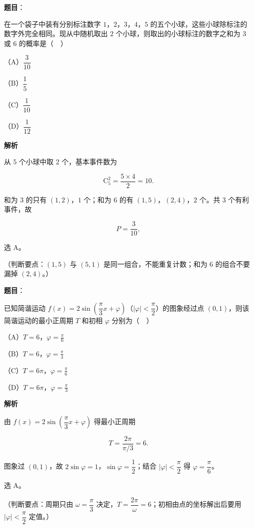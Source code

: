 \begin{answer}

\textbf{题目}：

在一个袋子中装有分别标注数字 $1$，$2$，$3$，$4$，$5$ 的五个小球，这些小球除标注的数字外完全相同。现从中随机取出 $2$ 个小球，则取出的小球标注的数字之和为 $3$ 或 $6$ 的概率是（　）

（A）$\dfrac{3}{10}$

（B）$\dfrac15$

（C）$\dfrac1{10}$

（D）$\dfrac1{12}$

\textbf{解析}

从 $5$ 个小球中取 $2$ 个，基本事件数为

\nopagebreak[4]
\[\mathrm C_5^2=\frac{5\times4}{2}=10.\]

和为 $3$ 的只有 $(1,2)$，$1$ 个；和为 $6$ 的有 $(1,5)$，$(2,4)$，$2$ 个。共 $3$ 个有利事件，故

\nopagebreak[4]
\[P=\frac{3}{10},\]

选 A。

（判断要点：$(1,5)$ 与 $(5,1)$ 是同一组合，不能重复计数；和为 $6$ 的组合不要漏掉 $(2,4)$。）


\end{answer}
\begin{answer}

\textbf{题目}：

已知简谐运动 $f(x)=2\sin\left(\dfrac{\pi}{3}x+\varphi\right)$（$|\varphi|<\dfrac{\pi}{2}$）的图象经过点 $(0,1)$，则该简谐运动的最小正周期 $T$ 和初相 $\varphi$ 分别为（　）

（A）$T=6$，$\varphi=\frac{\pi}{6}$

（B）$T=6$，$\varphi=\frac{\pi}{3}$

（C）$T=6\pi$，$\varphi=\frac{\pi}{6}$

（D）$T=6\pi$，$\varphi=\frac{\pi}{3}$

\textbf{解析}

由 $f(x)=2\sin\left(\dfrac{\pi}{3}x+\varphi\right)$ 得最小正周期

\nopagebreak[4]
\[T=\frac{2\pi}{\pi/3}=6.\]

图象过 $(0,1)$，故 $2\sin\varphi=1$，$\sin\varphi=\dfrac12$；结合 $|\varphi|<\dfrac{\pi}{2}$ 得 $\varphi=\dfrac{\pi}{6}$。

选 A。

（判断要点：周期只由 $\omega=\dfrac{\pi}{3}$ 决定，$T=\dfrac{2\pi}{\omega}=6$；初相由点的坐标解出后要用 $|\varphi|<\dfrac{\pi}{2}$ 定值。）


\end{answer}
